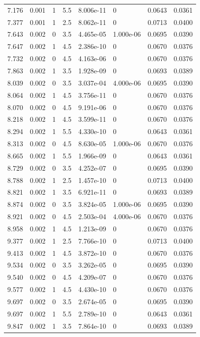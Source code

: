 \documentclass[preview]{standalone}
\begin{document}
{{{\begin{tabular}{L{1.2cm}C{1.2cm} C{0.3cm}C{0.5cm} C{1.4cm}C{1.4cm} C{1.4cm}C{1.4cm}}
  7.176  &  0.001  & 1     & 5.5 &  8.006e-11  & 0  & 0.0643 &  0.0361   \\ 
  7.377  &  0.001  & 1     & 2.5 &  8.062e-11  & 0  & 0.0713 &  0.0400   \\ 
  7.643  &  0.002  & 0     & 3.5 &  4.465e-05  & 1.000e-06  & 0.0695 &  0.0390   \\ 
  7.647  &  0.002  & 1     & 4.5 &  2.386e-10  & 0  & 0.0670 &  0.0376   \\ 
  7.732  &  0.002  & 0     & 4.5 &  4.163e-06  & 0  & 0.0670 &  0.0376   \\ 
  7.863  &  0.002  & 1     & 3.5 &  1.928e-09  & 0  & 0.0693 &  0.0389   \\ 
  8.039  &  0.002  & 0     & 3.5 &  3.037e-04  & 4.000e-06  & 0.0695 &  0.0390   \\ 
  8.064  &  0.002  & 1     & 4.5 &  3.756e-11  & 0  & 0.0670 &  0.0376   \\ 
  8.070  &  0.002  & 0     & 4.5 &  9.191e-06  & 0  & 0.0670 &  0.0376   \\ 
  8.218  &  0.002  & 1     & 4.5 &  3.599e-11  & 0  & 0.0670 &  0.0376   \\ 
  8.294  &  0.002  & 1     & 5.5 &  4.330e-10  & 0  & 0.0643 &  0.0361   \\ 
  8.313  &  0.002  & 0     & 4.5 &  8.630e-05  & 1.000e-06  & 0.0670 &  0.0376   \\ 
  8.665  &  0.002  & 1     & 5.5 &  1.966e-09  & 0  & 0.0643 &  0.0361   \\ 
  8.729  &  0.002  & 0     & 3.5 &  4.252e-07  & 0  & 0.0695 &  0.0390   \\ 
  8.788  &  0.002  & 1     & 2.5 &  1.457e-10  & 0  & 0.0713 &  0.0400   \\ 
  8.821  &  0.002  & 1     & 3.5 &  6.921e-11  & 0  & 0.0693 &  0.0389   \\ 
  8.874  &  0.002  & 0     & 3.5 &  3.824e-05  & 1.000e-06  & 0.0695 &  0.0390   \\ 
  8.921  &  0.002  & 0     & 4.5 &  2.503e-04  & 4.000e-06  & 0.0670 &  0.0376   \\ 
  8.958  &  0.002  & 1     & 4.5 &  1.213e-09  & 0  & 0.0670 &  0.0376   \\ 
  9.377  &  0.002  & 1     & 2.5 &  7.766e-10  & 0  & 0.0713 &  0.0400   \\ 
  9.413  &  0.002  & 1     & 4.5 &  3.872e-10  & 0  & 0.0670 &  0.0376   \\ 
  9.534  &  0.002  & 0     & 3.5 &  3.262e-05  & 0  & 0.0695 &  0.0390   \\ 
  9.540  &  0.002  & 0     & 4.5 &  4.209e-07  & 0  & 0.0670 &  0.0376   \\ 
  9.577  &  0.002  & 1     & 4.5 &  4.430e-10  & 0  & 0.0670 &  0.0376   \\ 
  9.697  &  0.002  & 0     & 3.5 &  2.674e-05  & 0  & 0.0695 &  0.0390   \\ 
  9.697  &  0.002  & 1     & 5.5 &  2.789e-10  & 0  & 0.0643 &  0.0361   \\ 
  9.847  &  0.002  & 1     & 3.5 &  7.864e-10  & 0  & 0.0693 &  0.0389   \\ 
\hline 
\end{tabular} 

}}}
\end{document}
